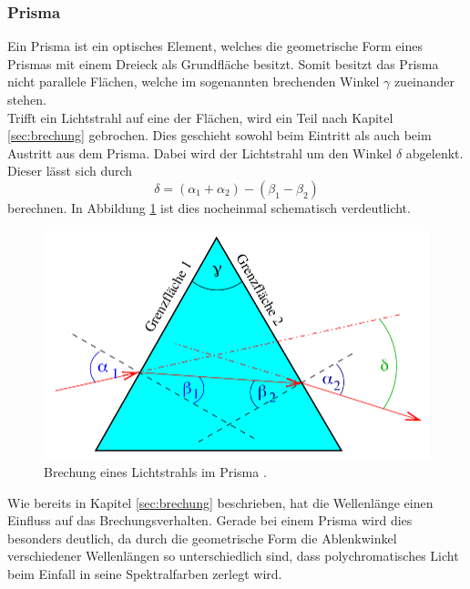 \subsubsection*{Prisma}
\label{sec:prisma}
Ein Prisma ist ein optisches Element, welches die geometrische Form eines Prismas mit einem Dreieck als Grundfläche
besitzt. Somit besitzt das Prisma nicht parallele Flächen, welche im sogenannten
brechenden Winkel $\gamma$ zueinander stehen.
\\\noindent
Trifft ein Lichtstrahl auf eine der Flächen, wird ein Teil nach Kapitel
\ref{sec:brechung} gebrochen. Dies geschieht sowohl beim Eintritt als auch beim Austritt aus dem Prisma. Dabei wird
der Lichtstrahl um den Winkel $\delta$ abgelenkt. Dieser lässt sich durch
\begin{equation}
    \delta=(\alpha_1+\alpha_2)-(\beta_1-\beta_2)
    \label{eqn:ablenkwinkel}
\end{equation}
berechnen. In Abbildung \ref{fig:prisma2} ist dies nocheinmal schematisch verdeutlicht.
\begin{figure}[H]
    \centering
    \includegraphics[scale = 0.4]{pictures/Prisma.png}
    \caption{Brechung eines Lichtstrahls im Prisma \cite{AP01}.}
    \label{fig:prisma2}
\end{figure}
\noindent
Wie bereits in Kapitel \ref{sec:brechung} beschrieben, hat die Wellenlänge einen Einfluss auf das Brechungsverhalten.
Gerade bei einem Prisma wird dies besonders deutlich, da durch die geometrische Form die Ablenkwinkel verschiedener
Wellenlängen so unterschiedlich sind, dass polychromatisches Licht beim Einfall in seine Spektralfarben zerlegt wird.
